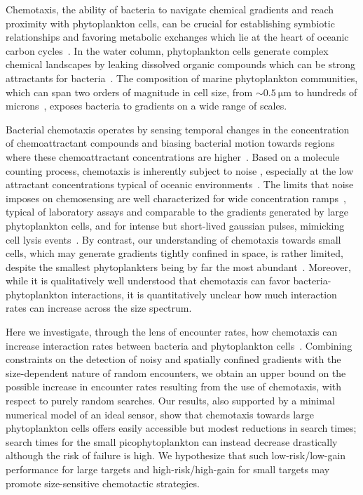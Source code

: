 \documentclass[9pt,twocolumn,twoside]{pnas-new}
\begin{document}
Chemotaxis, the ability of bacteria to navigate chemical gradients and reach proximity with phytoplankton cells, can be crucial for establishing symbiotic relationships and favoring metabolic exchanges which lie at the heart of oceanic carbon cycles~\cite{azam1998microbial,raina2019role,raina2022chemotaxis}.
In the water column, phytoplankton cells generate complex chemical landscapes by leaking dissolved organic compounds which can be strong attractants for bacteria~\cite{thornton2014dissolved,smriga2016chemotaxis,seymour2017zooming}.
The composition of marine phytoplankton communities, which can span two orders of magnitude in cell size, from $\sim\SI{0.5}{\micro\m}$ to hundreds of microns~\cite{sieburth1978pelagic}, exposes bacteria to gradients on a wide range of scales.

Bacterial chemotaxis operates by sensing temporal changes in the concentration of chemoattractant compounds and biasing bacterial motion towards regions where these chemoattractant concentrations are higher~\cite{macnab1972gradientsensing,brown1974temporal}. Based on a molecule counting process, chemotaxis is inherently subject to noise \cite{berg1977physics,tenwolde2016fundamental}, especially at the low attractant concentrations typical of oceanic environments~\cite{lee1975amino}.
The limits that noise imposes on chemosensing are well characterized for wide concentration ramps~\cite{mora2010limits}, typical of laboratory assays and comparable to the gradients generated by large phytoplankton cells, and for intense but short-lived gaussian pulses, mimicking cell lysis events~\cite{hein2016physical,brumley2019bacteria}.
By contrast, our understanding of chemotaxis towards small cells, which may generate gradients tightly confined in space, is rather limited, despite the smallest phytoplankters being by far the most abundant~\cite{sprules1986plankton,cermeno2008species}. Moreover, while it is qualitatively well understood that chemotaxis can favor bacteria-phytoplankton interactions, it is quantitatively unclear how much interaction rates can increase across the size spectrum.

Here we investigate, through the lens of encounter rates, how chemotaxis can increase interaction rates between bacteria and phytoplankton cells~\cite{slomka2023encounter}. Combining constraints on the detection of noisy and spatially confined gradients with the size-dependent nature of random encounters, we obtain an upper bound on the possible increase in encounter rates resulting from the use of chemotaxis, with respect to purely random searches. Our results, also supported by a minimal numerical model of an ideal sensor, show that chemotaxis towards large phytoplankton cells offers easily accessible but modest reductions in search times; search times for the small picophytoplankton can instead decrease drastically although the risk of failure is high. We hypothesize that such low-risk/low-gain performance for large targets and high-risk/high-gain for small targets may promote size-sensitive chemotactic strategies.
\end{document}

